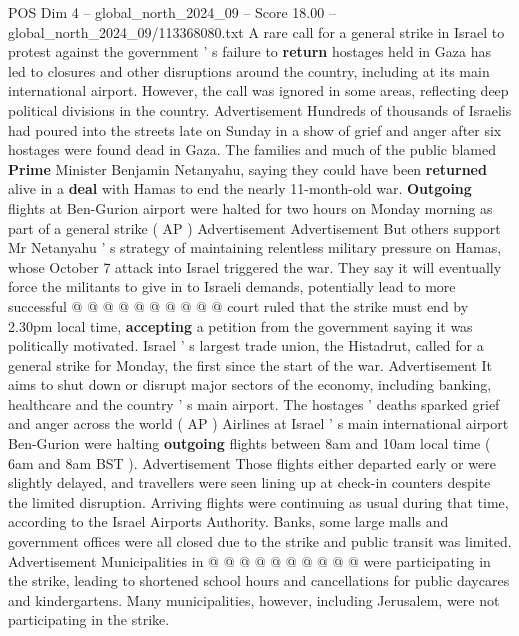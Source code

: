 \begin{textsample}{POS Dim 4 – global\_north\_2024\_09 – Score 18.00 – global\_north\_2024\_09/113368080.txt}  \label{ex:f4_pos_319}
A rare call for a general strike in Israel to protest against the government ' s failure to \textbf{return} hostages held in Gaza has led to closures and other disruptions around the country, including at its main international airport.
However, the call was ignored in some areas, reflecting deep political divisions in the country.
Advertisement Hundreds of thousands of Israelis had poured into the streets late on Sunday in a show of grief and anger after six hostages were found dead in Gaza.
The families and much of the public blamed \textbf{Prime} Minister Benjamin Netanyahu, saying they could have been \textbf{returned} alive in a \textbf{deal} with Hamas to end the nearly 11-month-old war. \textbf{Outgoing} flights at Ben-Gurion airport were halted for two hours on Monday morning as part of a general strike ( AP ) Advertisement Advertisement But others support Mr Netanyahu ' s strategy of maintaining relentless military pressure on Hamas, whose October 7 attack into Israel triggered the war.
They say it will eventually force the militants to give in to Israeli demands, potentially lead to more successful @ @ @ @ @ @ @ @ @ @ court ruled that the strike must end by 2.30pm local time, \textbf{accepting} a petition from the government saying it was politically motivated.
Israel ' s largest trade union, the Histadrut, called for a general strike for Monday, the first since the start of the war.
Advertisement It aims to shut down or disrupt major sectors of the economy, including banking, healthcare and the country ' s main airport.
The hostages ' deaths sparked grief and anger across the world ( AP ) Airlines at Israel ' s main international airport Ben-Gurion were halting \textbf{outgoing} flights between 8am and 10am local time ( 6am and 8am BST ).
Advertisement Those flights either departed early or were slightly delayed, and travellers were seen lining up at check-in counters despite the limited disruption.
Arriving flights were continuing as usual during that time, according to the Israel Airports Authority.
Banks, some large malls and government offices were all closed due to the strike and public transit was limited.
Advertisement Municipalities in @ @ @ @ @ @ @ @ @ @ were participating in the strike, leading to shortened school hours and cancellations for public daycares and kindergartens.
Many municipalities, however, including Jerusalem, were not participating in the strike.

\end{textsample}
